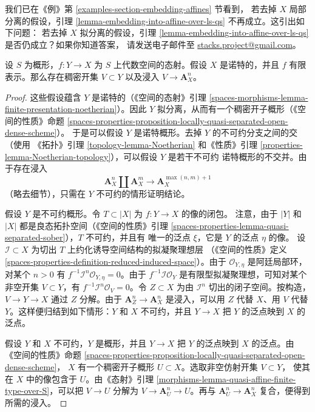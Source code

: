 \begin{remark}
\label{remark-cannot-embed-in-general}
我们已在《例》第 \ref{examples-section-embedding-affines} 节看到，
若去掉 $X$ 局部分离的假设，引理
\ref{lemma-embedding-into-affine-over-ls-qs} 不再成立。这引出如下问题：
若去掉 $X$ 拟分离的假设，引理
\ref{lemma-embedding-into-affine-over-ls-qs} 是否仍成立？如果你知道答案，
请发送电子邮件至
\href{mailto:stacks.project@gmail.com}{stacks.project@gmail.com}。
\end{remark}

\begin{lemma}
\label{lemma-embedding-into-affine-over-qs}
设 $S$ 为概形，$f : Y \to X$ 为 $S$ 上代数空间的态射。假设 $X$
是诺特的，并且 $f$ 有限表示。那么存在稠密开集 $V \subset Y$ 以及浸入
$V \to \mathbf{A}^n_X$。
\end{lemma}

\begin{proof}
这些假设蕴含 $Y$ 是诺特的（《空间的态射》引理
\ref{spaces-morphisms-lemma-finite-presentation-noetherian}）。因此 $Y$
拟分离，从而有一个稠密开子概形（《空间的性质》命题
\ref{spaces-properties-proposition-locally-quasi-separated-open-dense-scheme}）。
于是可以假设 $Y$ 是诺特概形。去掉 $Y$ 的不可约分支之间的交（使用
《拓扑》引理 \ref{topology-lemma-Noetherian} 和《性质》引理
\ref{properties-lemma-Noetherian-topology}），可以假设 $Y$ 是若干不可约
诺特概形的不交并。由于存在浸入
$$
\mathbf{A}^n_X \amalg \mathbf{A}^m_X
\longrightarrow
\mathbf{A}^{\max(n, m) + 1}_X
$$
（略去细节），只需在 $Y$ 不可约的情形证明结论。

\medskip\noindent
假设 $Y$ 是不可约概形。令 $T \subset |X|$ 为 $f : Y \to X$ 的像的闭包。
注意，由于 $|Y|$ 和 $|X|$ 都是良态拓扑空间（《空间的性质》引理
\ref{spaces-properties-lemma-quasi-separated-sober}），$T$ 不可约，并且有
唯一的泛点 $\xi$，它是 $Y$ 的泛点 $\eta$ 的像。
设 $\mathcal{I} \subset X$ 为切出 $T$ 上约化诱导空间结构的拟凝聚理想层
（《空间的性质》定义
\ref{spaces-properties-definition-reduced-induced-space}）。由于
$\mathcal{O}_{Y, \eta}$ 是阿廷局部环，对某个 $n > 0$ 有
$f^{-1}\mathcal{I}^n \mathcal{O}_{Y, \eta} = 0$。由于
$f^{-1}\mathcal{I}\mathcal{O}_Y$ 是有限型拟凝聚理想，可知对某个非空开集
$V \subset Y$，有 $f^{-1}\mathcal{I}^n\mathcal{O}_V = 0$。令
$Z \subset X$ 为由 $\mathcal{I}^n$ 切出的闭子空间。按构造，
$V \to Y \to X$ 通过 $Z$ 分解。由于
$\mathbf{A}^n_Z \to \mathbf{A}^n_X$ 是浸入，可以用 $Z$ 代替 $X$、用
$V$ 代替 $Y$。这样便归结到如下情形：$Y$ 和 $X$ 不可约，并且
$Y \to X$ 把 $Y$ 的泛点映到 $X$ 的泛点。

\medskip\noindent
假设 $Y$ 和 $X$ 不可约，$Y$ 是概形，并且 $Y \to X$ 把 $Y$ 的泛点映到
$X$ 的泛点。由《空间的性质》命题
\ref{spaces-properties-proposition-locally-quasi-separated-open-dense-scheme}，
$X$ 有一个稠密开子概形 $U \subset X$。选取非空仿射开集 $V \subset Y$，
使其在 $X$ 中的像包含于 $U$。由《态射》引理
\ref{morphisms-lemma-quasi-affine-finite-type-over-S}，可以把 $V \to U$
分解为 $V \to \mathbf{A}^n_U \to U$。再与
$\mathbf{A}^n_U \to \mathbf{A}^n_X$ 复合，便得到所需的浸入。
\end{proof}








